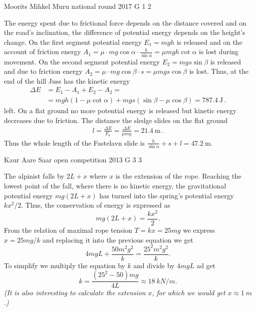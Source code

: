\documentclass[11pt]{article}
\begin{document}
{Moorits Mihkel Muru} %
{national round} %
{2017} %
{G 1} %
{2} %
{

\ifEngSolution
The energy spent due to frictional force depends on the distance covered and on the road’s inclination, the difference of potential energy depends on the height’s change. On the first segment potential energy \(E_1 = mgh\) is released and on the account of friction energy \( A_1 = \mu \cdot mg\cos\alpha \cdot \frac{h}{\sin\alpha} = \mu mgh \cot\alpha \) is lost during movement. On the second segment potential energy \(E_2 = mgs \sin\beta\) is released and due to friction energy \( A_2 = \mu \cdot mg \cos \beta \cdot s = \mu mgs \cos \beta \) is lost. Thus, at the end of the hill Juss has the kinetic energy
\begin{align*}
\Delta E &= E_1 - A_1 + E_2 - A_2 = \\
&= mgh(1-\mu\cot\alpha) + mgs(\sin\beta - \mu\cos\beta) =  \SI{787.4}{\joule} \, .
\end{align*} 
left. On a flat ground no more potential energy is released but kinetic energy decreases due to friction. The distance the sledge slides on the flat ground
\begin{align*}
l = \frac{\Delta E}{F_h} = \frac{\Delta E}{\mu mg} = \SI{21.4}{\meter} \, .
\end{align*} 
Thus the whole length of the Fastelavn slide is \(\frac{h}{\sin\alpha} + s + l = \SI{47.2}{\meter}\).
\fi
}

{Kaur Aare Saar} %
{open competition} %
{2013} %
{G 3} %
{3} %
{

\ifEngSolution
The alpinist falls by $2L+x$ where $x$ is the extension of the rope. Reaching the lowest point of the fall, where there is no kinetic energy, the gravitational potential energy $mg(2L+x)$ has turned into the spring’s potential energy $kx^2/2$. Thus, the conservation of energy is expressed as 
\[mg(2L+x)=\frac{kx^2}{2}.\]
From the relation of maximal rope tension $T=kx=25mg$ we express $x=25mg/k$ and replacing it into the previous equation we get
\[4mgL+\frac{50m^2g^2}{k}=\frac{25^2m^2g^2}{k}.\]
To simplify we multiply the equation by $k$ and divide by $4mgL$ ad get 
\[k=\frac{(25^2-50)mg}{4L}\approx \SI{18}{kN/m}.\] 
\emph{(It is also interesting to calculate the extension $x$, for which we would get $x\approx \SI{1}{m}$.)}
\fi
}
\end{document}
